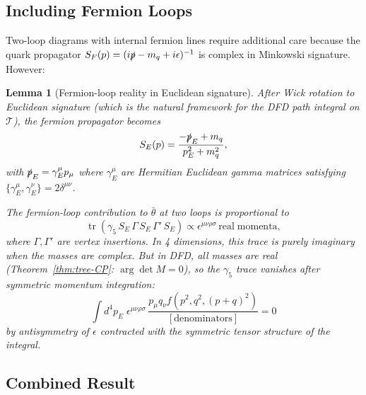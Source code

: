 \documentclass[11pt,a4paper]{article}
\newtheorem{lemma}[theorem]{Lemma}
\theoremstyle{remark}
\newcommand{\tr}{\operatorname{tr}}
\begin{document}
\subsection{Including Fermion Loops}

Two-loop diagrams with internal fermion lines require additional care because
the quark propagator $S_F(p) = (i\slashed{p} - m_q + i\epsilon)^{-1}$ is
complex in Minkowski signature. However:

\begin{lemma}[Fermion-loop reality in Euclidean signature]
\label{lem:fermion-loop}
After Wick rotation to Euclidean signature (which is the natural framework
for the DFD path integral on $\mathcal{T}$), the fermion propagator becomes
\begin{equation}
S_E(p) = \frac{-\slashed{p}_E + m_q}{p_E^2 + m_q^2},
\end{equation}
with $\slashed{p}_E = \gamma_E^\mu p_\mu$ where $\gamma_E^\mu$ are
Hermitian Euclidean gamma matrices satisfying $\{\gamma_E^\mu, \gamma_E^\nu\} = 2\delta^{\mu\nu}$.

The fermion-loop contribution to $\bar\theta$ at two loops is proportional to
\begin{equation}
\tr(\gamma_5\,S_E\,\Gamma\,S_E\,\Gamma'\,S_E) \propto \epsilon^{\mu\nu\rho\sigma}\,\mathrm{real\;momenta},
\end{equation}
where $\Gamma, \Gamma'$ are vertex insertions. In 4 dimensions, this trace
is purely imaginary when the masses are complex. But in DFD, all masses are
real (Theorem~\ref{thm:tree-CP}: $\arg\det M = 0$), so the $\gamma_5$ trace
vanishes after symmetric momentum integration:
\begin{equation}
\int d^4p_E\;\epsilon^{\mu\nu\rho\sigma}\,\frac{p_\mu q_\nu f(p^2,q^2,(p+q)^2)}{[\text{denominators}]} = 0
\end{equation}
by antisymmetry of $\epsilon$ contracted with the symmetric tensor structure
of the integral.
\end{lemma}

\subsection{Combined Result}
\end{document}
